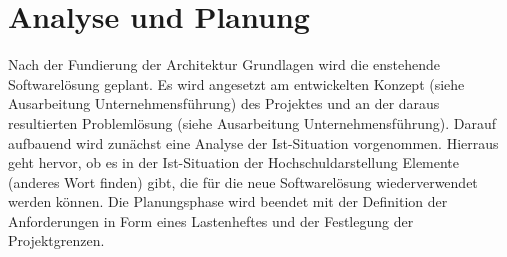 \section{Analyse und Planung}
\label{sec:AnalyseUndPlanung}

Nach der Fundierung der Architektur Grundlagen wird die enstehende Softwarelösung geplant. Es wird angesetzt am 
entwickelten Konzept (siehe Ausarbeitung Unternehmensführung) des Projektes und an der daraus resultierten Problemlösung 
(siehe Ausarbeitung Unternehmensführung). Darauf aufbauend wird zunächst eine Analyse der Ist-Situation vorgenommen. 
Hierraus geht hervor, ob es in der Ist-Situation der Hochschuldarstellung Elemente (anderes Wort finden) gibt, die für die 
neue Softwarelösung wiederverwendet werden können. Die Planungsphase wird beendet mit der Definition der Anforderungen in 
Form eines Lastenheftes und der Festlegung der Projektgrenzen.